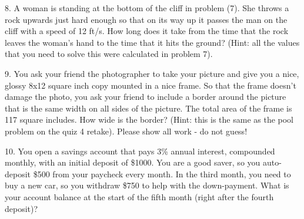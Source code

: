 \documentclass[letterpaper, 12pt]{article}
\begin{document}
\vspace{4in}

8. A woman is standing at the bottom of the cliff in problem (7). She throws a
rock upwards just hard enough so that on its way up it passes the man on the
cliff with a speed of 12 ft/s. How long does it take from the time that the
rock leaves the woman's hand to the time that it hits the ground? (Hint: all
the values that you need to solve this were calculated in problem 7).

\newpage

9. You ask your friend the photographer to take your picture and give you a
nice, glossy 8x12 square inch copy mounted in a nice frame. So that the frame
doesn't damage the photo, you ask your friend to include a border around the
picture that is the same width on all sides of the picture. The total area of
the frame is 117 square includes.  How wide is the border? (Hint: this is the
same as the pool problem on the quiz 4 retake). Please show all work - do not
guess!

\vspace{4in}

10. You open a savings account that pays 3\% annual interest, compounded
monthly, with an initial deposit of \$1000. You are a good saver, so you
auto-deposit \$500 from your paycheck every month. In the third month, you
need to buy a new car, so you withdraw \$750 to help with the down-payment.
What is your account balance at the start of the fifth month (right
after the fourth deposit)?
\end{document}
